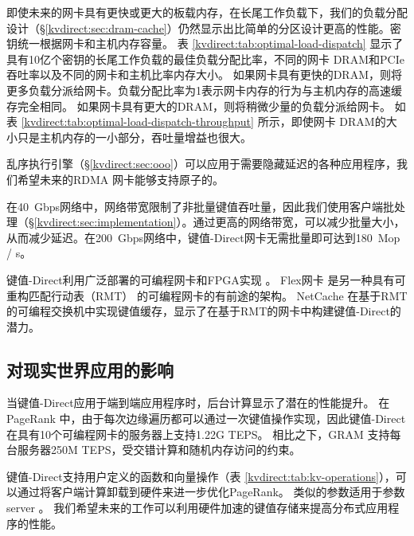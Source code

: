 即使未来的网卡具有更快或更大的板载内存，在长尾工作负载下，我们的负载分配设计（\S \ref {kvdirect:sec:dram-cache}）仍然显示出比简单的分区设计更高的性能。密钥统一根据网卡和主机内存容量。
表 \ref {kvdirect:tab:optimal-load-dispatch} 显示了具有10亿个密钥的长尾工作负载的最佳负载分配比率，不同的网卡 DRAM和PCIe吞吐率以及不同的网卡和主机比率内存大小。
如果网卡具有更快的DRAM，则将更多负载分派给网卡。负载分配比率为1表示网卡内存的行为与主机内存的高速缓存完全相同。
如果网卡具有更大的DRAM，则将稍微少量的负载分派给网卡。
如表 \ref {kvdirect:tab:optimal-load-dispatch-throughput} 所示，即使网卡 DRAM的大小只是主机内存的一小部分，吞吐量增益也很大。

乱序执行引擎（\S \ref {kvdirect:sec:ooo}）可以应用于需要隐藏延迟的各种应用程序，我们希望未来的RDMA 网卡能够支持原子的。

在40~Gbps网络中，网络带宽限制了非批量键值吞吐量，因此我们使用客户端批处理（\S \ref {kvdirect:sec:implementation}）。通过更高的网络带宽，可以减少批量大小，从而减少延迟。在200~Gbps网络中，键值-Direct网卡无需批量即可达到180~Mop / s。

键值-Direct利用广泛部署的可编程网卡和FPGA实现 \cite{putnam2014reconfigurable,caulfield2016cloud}。 Flex网卡 \cite {kaufmann2015flexnic,kaufmann2016krishnamurthy} 是另一种具有可重构匹配行动表（RMT） \cite {bosshart2013forwarding} 的可编程网卡的有前途的架构。
NetCache \cite {netcache-sosp17} 在基于RMT的可编程交换机中实现键值缓存，显示了在基于RMT的网卡中构建键值-Direct的潜力。

\subsection{对现实世界应用的影响}

当键值-Direct应用于端到端应用程序时，后台计算显示了潜在的性能提升。 在PageRank \cite {page1999pagerank}中，由于每次边缘遍历都可以通过一次键值操作实现，因此键值-Direct在具有10个可编程网卡的服务器上支持1.22G TEPS。 相比之下，GRAM \cite {wu2015g}支持每台服务器250M TEPS，受交错计算和随机内存访问的约束。

键值-Direct支持用户定义的函数和向量操作（表 \ref {kvdirect:tab:kv-operations}），可以通过将客户端计算卸载到硬件来进一步优化PageRank。 类似的参数适用于参数server \cite {li2014scaling}。 我们希望未来的工作可以利用硬件加速的键值存储来提高分布式应用程序的性能。

